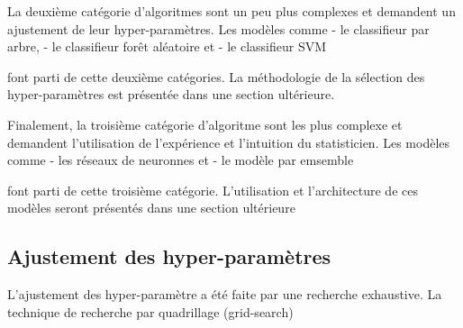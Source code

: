 La deuxième catégorie d'algoritmes sont un peu plus complexes et demandent un ajustement de leur hyper-paramètres. Les modèles comme 
- le classifieur par arbre, 
- le classifieur forêt aléatoire et 
- le classifieur SVM 

font parti de cette deuxième catégories. La méthodologie de la sélection des hyper-paramètres est présentée dans une section ultérieure.

Finalement, la troisième catégorie d'algoritme sont les plus complexe et demandent l'utilisation de l'expérience et l'intuition du statisticien. Les modèles comme 
- les réseaux de neuronnes et 
- le modèle par emsemble 

font parti de cette troisième catégorie. L'utilisation et l'architecture de ces modèles seront présentés dans une section ultérieure

\subsection{Ajustement des hyper-paramètres}

L'ajustement des hyper-paramètre a été faite par une recherche exhaustive. La technique de recherche par quadrillage (grid-search) 


\subsection{}

